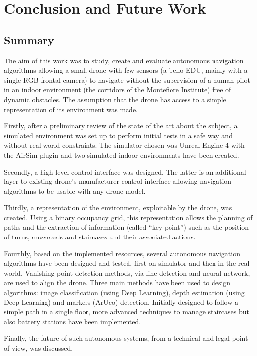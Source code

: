 \chapter{Conclusion and Future Work}\label{ch:conclusion.future.work}

\section{Summary}

The aim of this work was to study, create and evaluate autonomous navigation algorithms allowing a small drone with few sensors (a Tello EDU, mainly with a single RGB frontal camera) to navigate without the supervision of a human pilot in an indoor environment (the corridors of the Montefiore Institute) free of dynamic obstacles. The assumption that the drone has access to a simple representation of its environment was made.

Firstly, after a preliminary review of the state of the art about the subject, a simulated environment was set up to perform initial tests in a safe way and without real world constraints. The simulator chosen was Unreal Engine 4 with the AirSim plugin and two simulated indoor environments have been created.

Secondly, a high-level control interface was designed. The latter is an additional layer to existing drone's manufacturer control interface allowing navigation algorithms to be usable with any drone model.

Thirdly, a representation of the environment, exploitable by the drone, was created. Using a binary occupancy grid, this representation allows the planning of paths and the extraction of information (called \enquote{key point}) such as the position of turns, crossroads and staircases and their associated actions.

Fourthly, based on the implemented resources, several autonomous navigation algorithms have been designed and tested, first on simulator and then in the real world. Vanishing point detection methods, via line detection and neural network, are used to align the drone. Three main methods have been used to design algorithms: image classification (using Deep Learning), depth estimation (using Deep Learning) and markers (ArUco) detection. Initially designed to follow a simple path in a single floor, more advanced techniques to manage staircases but also battery stations have been implemented.

Finally, the future of such autonomous systems, from a technical and legal point of view, was discussed.

